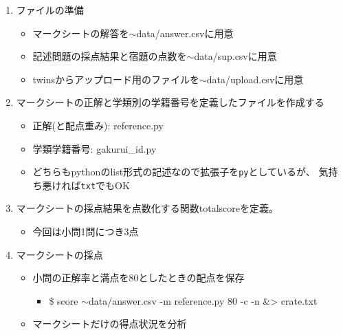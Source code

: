 \begin{enumerate}
\item ファイルの準備

\begin{itemize}
\item マークシートの解答を\ensuremath{\sim}data\slash answer.csvに用意

\item 記述問題の採点結果と宿題の点数を\ensuremath{\sim}data\slash sup.csvに用意

\item twinsからアップロード用のファイルを\ensuremath{\sim}data\slash upload.csvに用意

\end{itemize}

\item マークシートの正解と学類別の学籍番号を定義したファイルを作成する

\begin{itemize}
\item 正解(と配点重み): reference.py

\item 学類学籍番号: gakurui\_id.py

\item どちらもpythonのlist形式の記述なので拡張子を\texttt{py}としているが、
気持ち悪ければ\texttt{txt}でもOK

\end{itemize}

\item マークシートの採点結果を点数化する関数totalscoreを定義。

\begin{itemize}
\item 今回は小問1問につき3点

\end{itemize}

\item マークシートの採点

\begin{itemize}
\item 小問の正解率と満点を80としたときの配点を保存

\begin{itemize}
\item \$ score \ensuremath{\sim}data\slash answer.csv -m reference.py 80 -c -n \&> crate.txt

\end{itemize}

\item マークシートだけの得点状況を分析


\end{itemize}
\end{enumerate}

